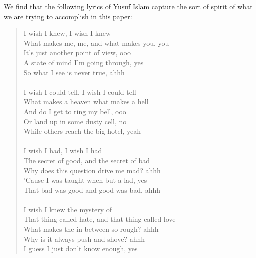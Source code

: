 \documentclass{article}
\begin{document}
We find that the following lyrics of Yusuf Islam \cite{iwish} capture
the sort of spirit of what we are trying to accomplish in this paper:
\begin{quote}
  I wish I knew, I wish I knew\\
  What makes me, me, and what makes you, you\\
  It's just another point of view, ooo\\
  A state of mind I'm going through, yes\\
  So what I see is never true, ahhh\\
\\
  I wish I could tell, I wish I could tell\\
  What makes a heaven what makes a hell\\
  And do I get to ring my bell, ooo\\
  Or land up in some dusty cell, no\\
  While others reach the big hotel, yeah\\
\\
  I wish I had, I wish I had\\
  The secret of good, and the secret of bad\\
  Why does this question drive me mad? ahhh\\
  'Cause I was taught when but a lad, yes\\
  That bad was good and good was bad, ahhh\\
\\
  I wish I knew the mystery of\\
  That thing called hate, and that thing called love\\
  What makes the in-between so rough? ahhh\\
  Why is it always push and shove? ahhh\\
  I guess I just don't know enough, yes\\
\end{quote}

 

\end{document}
